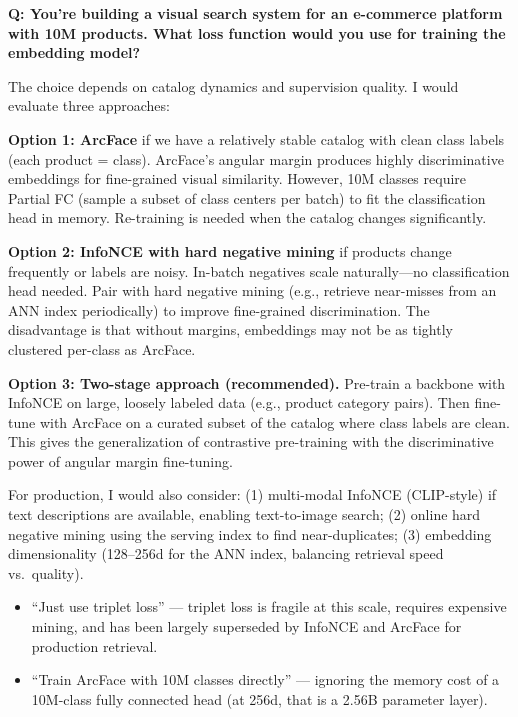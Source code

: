 \begin{interviewq}
\textbf{Q: You're building a visual search system for an e-commerce platform with 10M products. What loss function would you use for training the embedding model?}

 \quad {} \quad \badgefreq{\freqhigh}

\stronganswer The choice depends on catalog dynamics and supervision quality. I would evaluate three approaches:

\textbf{Option 1: ArcFace} if we have a relatively stable catalog with clean class labels (each product = class). ArcFace's angular margin produces highly discriminative embeddings for fine-grained visual similarity. However, 10M classes require Partial FC (sample a subset of class centers per batch) to fit the classification head in memory. Re-training is needed when the catalog changes significantly.

\textbf{Option 2: InfoNCE with hard negative mining} if products change frequently or labels are noisy. In-batch negatives scale naturally---no classification head needed. Pair with hard negative mining (e.g., retrieve near-misses from an ANN index periodically) to improve fine-grained discrimination. The disadvantage is that without margins, embeddings may not be as tightly clustered per-class as ArcFace.

\textbf{Option 3: Two-stage approach (recommended).} Pre-train a backbone with InfoNCE on large, loosely labeled data (e.g., product category pairs). Then fine-tune with ArcFace on a curated subset of the catalog where class labels are clean. This gives the generalization of contrastive pre-training with the discriminative power of angular margin fine-tuning.

For production, I would also consider: (1) multi-modal InfoNCE (CLIP-style) if text descriptions are available, enabling text-to-image search; (2) online hard negative mining using the serving index to find near-duplicates; (3) embedding dimensionality (128--256d for the ANN index, balancing retrieval speed vs.\ quality).

\redflags
\begin{itemize}
    \item ``Just use triplet loss'' --- triplet loss is fragile at this scale, requires expensive mining, and has been largely superseded by InfoNCE and ArcFace for production retrieval.
    \item ``Train ArcFace with 10M classes directly'' --- ignoring the memory cost of a 10M-class fully connected head (at 256d, that is a 2.56B parameter layer).
\end{itemize}


\end{interviewq}
